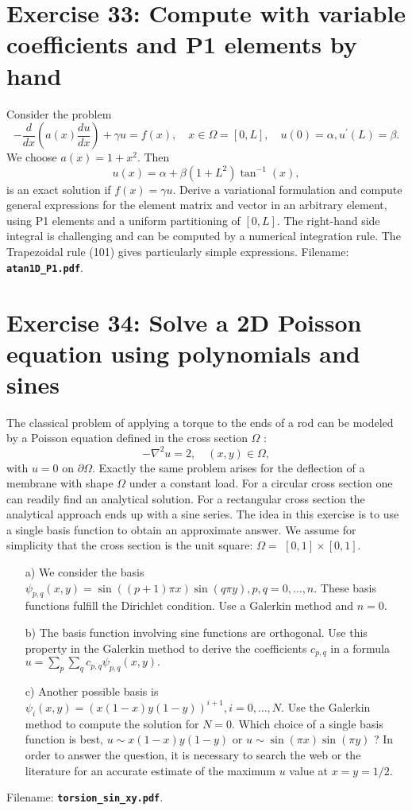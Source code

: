 \documentclass[../main.tex]{subfiles}
\begin{document}
	\section*{Exercise 33: Compute with variable coefficients and P1 elements by hand}
		\noindent Consider the problem
		\begin{equation}
			\label{311}
			-\frac{d}{d x}\left(a(x) \frac{d u}{d x}\right)+\gamma u=f(x), \quad x \in \Omega=[0, L], \quad u(0)=\alpha, u^{\prime}(L)=\beta .
		\end{equation}
		We choose $a(x)=1+x^{2}$. Then
		\begin{equation}
			\label{312}
			u(x)=\alpha+\beta\left(1+L^{2}\right) \tan ^{-1}(x),
		\end{equation}
		is an exact solution if $f(x)=\gamma u$.\smallbreak
		Derive a variational formulation and compute general expressions for the element matrix and vector in an arbitrary element, using P1 elements and a uniform partitioning of $[0, L]$. The right-hand side integral is challenging and can be computed by a numerical integration rule. The Trapezoidal rule (101) gives particularly simple expressions. Filename: \textbf{\texttt{atan1D\_P1.pdf}}.\bigbreak
	\section*{Exercise 34: Solve a 2D Poisson equation using polynomials and sines}
		\noindent The classical problem of applying a torque to the ends of a rod can be modeled by a Poisson equation defined in the cross section $\Omega$ :
		$$
		-\nabla^{2} u=2, \quad(x, y) \in \Omega,
		$$
		with $u=0$ on $\partial \Omega$. Exactly the same problem arises for the deflection of a membrane with shape $\Omega$ under a constant load.\smallbreak
		For a circular cross section one can readily find an analytical solution. For a rectangular cross section the analytical approach ends up with a sine series. The idea in this exercise is to use a single basis function to obtain an approximate answer.\smallbreak
		We assume for simplicity that the cross section is the unit square: $\Omega=$ $[0,1] \times[0,1]$.
		\begin{enumerate}
			\item[a)] We consider the basis $\psi_{p, q}(x, y)=\sin ((p+1) \pi x) \sin (q \pi y), p, q=0, \ldots, n$. These basis functions fulfill the Dirichlet condition. Use a Galerkin method and $n=0$.
			\item[b)] The basis function involving sine functions are orthogonal. Use this property in the Galerkin method to derive the coefficients $c_{p, q}$ in a formula $u=\sum_{p} \sum_{q} c_{p, q} \psi_{p, q}(x, y) .$
			\item [c)] Another possible basis is $\psi_{i}(x, y)=(x(1-x) y(1-y))^{i+1}, i=0, \ldots, N$. Use the Galerkin method to compute the solution for $N=0$. Which choice of a single basis function is best, $u \sim x(1-x) y(1-y)$ or $u \sim \sin (\pi x) \sin (\pi y)$ ? In order to answer the question, it is necessary to search the web or the literature for an accurate estimate of the maximum $u$ value at $x=y=1 / 2$.
		\end{enumerate}
			Filename: \textbf{\texttt{torsion\_sin\_xy.pdf}}.\bigbreak
\end{document}
